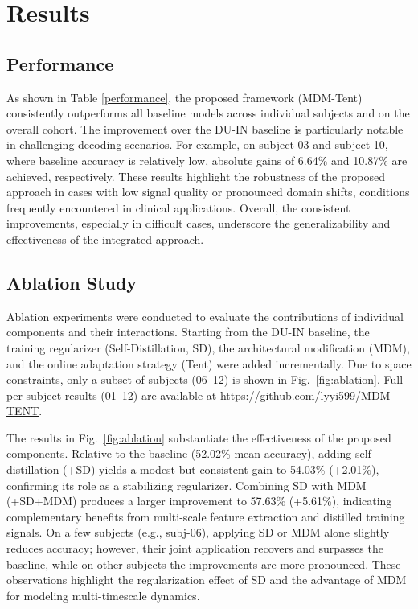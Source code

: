 \documentclass{article}
\begin{document}
\section{Results}
\subsection{Performance}
As shown in Table \ref{performance}, the proposed framework (MDM-Tent) consistently outperforms all baseline models across individual subjects and on the overall cohort. The improvement over the DU-IN baseline is particularly notable in challenging decoding scenarios. For example, on subject-03 and subject-10, where baseline accuracy is relatively low, absolute gains of 6.64\% and 10.87\% are achieved, respectively. These results highlight the robustness of the proposed approach in cases with low signal quality or pronounced domain shifts, conditions frequently encountered in clinical applications. Overall, the consistent improvements, especially in difficult cases, underscore the generalizability and effectiveness of the integrated approach.



\subsection{Ablation Study}
Ablation experiments were conducted to evaluate the contributions of individual components and their interactions. Starting from the DU-IN baseline, the training regularizer (Self-Distillation, SD), the architectural modification (MDM), and the online adaptation strategy (Tent) were added incrementally. Due to space constraints, only a subset of subjects (06--12) is shown in Fig.~\ref{fig:ablation}. Full per-subject results (01--12) are available at \url{https://github.com/lyyi599/MDM-TENT}.

The results in Fig.~\ref{fig:ablation} substantiate the effectiveness of the proposed components. Relative to the baseline (52.02\% mean accuracy), adding self-distillation (+SD) yields a modest but consistent gain to 54.03\% (+2.01\%), confirming its role as a stabilizing regularizer. Combining SD with MDM (+SD+MDM) produces a larger improvement to 57.63\% (+5.61\%), indicating complementary benefits from multi-scale feature extraction and distilled training signals. On a few subjects (e.g., subj-06), applying SD or MDM alone slightly reduces accuracy; however, their joint application recovers and surpasses the baseline, while on other subjects the improvements are more pronounced. These observations highlight the regularization effect of SD and the advantage of MDM for modeling multi-timescale dynamics.
\end{document}
